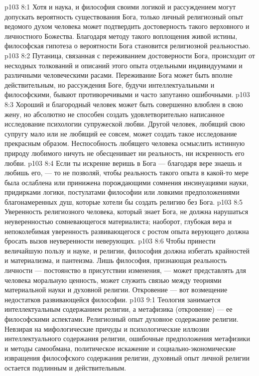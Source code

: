 \vs p103 8:1 Хотя и наука, и философия своими логикой и рассуждением могут допускать вероятность существования Бога, только личный религиозный опыт ведомого духом человека может подтвердить достоверность такого верховного и личностного Божества. Благодаря методу такого воплощения живой истины, философская гипотеза о вероятности Бога становится религиозной реальностью.
\vs p103 8:2 Путаница, связанная с переживанием достоверности Бога, происходит от несходных толкований и описаний этого опыта отдельными индивидуумами и различными человеческими расами. Переживание Бога может быть вполне действительным, но рассуждения  Боге, будучи интеллектуальными и философскими, бывают противоречивыми и часто запутанно ошибочными.
\vs p103 8:3 Хороший и благородный человек может быть совершенно влюблен в свою жену, но абсолютно не способен создать удовлетворительно написанное исследование психологии супружеской любви. Другой человек, любящий свою супругу мало или не любящий ее совсем, может создать такое исследование прекрасным образом. Неспособность любящего человека осмыслить истинную природу любимого ничуть не обесценивает ни реальность, ни искренность его любви.
\vs p103 8:4 \pc Если ты искренне веришь в Бога --- благодаря вере знаешь и любишь его, --- то не позволяй, чтобы реальность такого опыта в какой\hyp{}то мере была ослаблена или принижена порождающими сомнения инсинуациями науки, придирками логики, постулатами философии или ловкими предположениями благонамеренных душ, которые хотели бы создать религию без Бога.
\vs p103 8:5 Уверенность религиозного человека, который знает Бога, не должна нарушаться неуверенностью сомневающегося материалиста; наоборот, глубокая вера и непоколебимая уверенность развивающегося с ростом опыта верующего должна бросать вызов неуверенности неверующих.
\vs p103 8:6 \pc Чтобы принести величайшую пользу и науке, и религии, философия должна избегать крайностей и материализма, и пантеизма. Лишь философия, признающая реальность личности --- постоянство в присутствии изменения, --- может представлять для человека моральную ценность, может служить связью между теориями материальной науки и духовной религии. Откровение --- вот возмещение недостатков развивающейся философии.
\vs p103 9:1 Теология занимается интеллектуальным содержанием религии, а метафизика (откровение) --- ее философскими аспектами. Религиозный опыт  духовное содержание религии. Невзирая на мифологические причуды и психологические иллюзии интеллектуального содержания религии, ошибочные предположения метафизики и методы самообмана, политическое искажение и социально\hyp{}экономические извращения философского содержания религии, духовный опыт личной религии остается подлинным и действительным.

